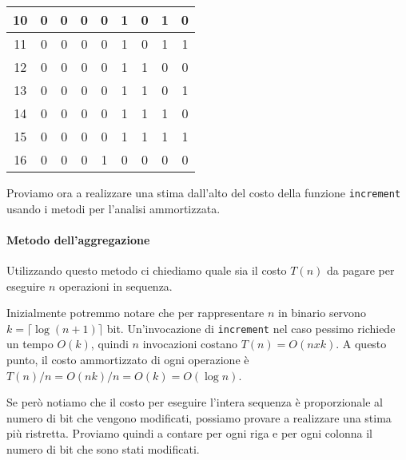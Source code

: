 \begin{eg}
\begin{table}[h!]
\begin{tabular}{|c|c|c|c|c|c|c|c|c|}
        \hline
        10 & 0 & 0 & 0 & 0 & 1 & 0 & 1 & 0\\
        \hline
        11 & 0 & 0 & 0 & 0 & 1 & 0 & 1 & 1\\
        \hline
        12 & 0 & 0 & 0 & 0 & 1 & 1 & 0 & 0\\
        \hline
        13 & 0 & 0 & 0 & 0 & 1 & 1 & 0 & 1\\
        \hline
        14 & 0 & 0 & 0 & 0 & 1 & 1 & 1 & 0\\
        \hline
        15 & 0 & 0 & 0 & 0 & 1 & 1 & 1 & 1\\
        \hline
        16 & 0 & 0 & 0 & 1 & 0 & 0 & 0 & 0\\
        \hline
    \end{tabular}
\end{table}

\bigskip\noindent
Proviamo ora a realizzare una stima dall'alto del costo della funzione
\texttt{increment} usando i metodi per l'analisi ammortizzata.

\paragraph{Metodo dell'aggregazione}
Utilizzando questo metodo ci chiediamo quale sia il costo $T(n)$ da pagare per
eseguire $n$ operazioni in sequenza.

Inizialmente potremmo notare che per rappresentare $n$ in binario servono
$k=\lceil\log(n+1)\rceil$ bit. Un'invocazione di \texttt{increment} nel caso
pessimo richiede un tempo $O(k)$, quindi $n$ invocazioni costano $T(n)=O(nxk)$.
A questo punto, il costo ammortizzato di ogni operazione è $T(n)/n=O(nk)/n=O(k)=O(\log n)$.

Se però notiamo che il costo per eseguire l'intera sequenza è proporzionale al
numero di bit che vengono modificati, possiamo provare a realizzare una stima
più ristretta. Proviamo quindi a contare per ogni riga e per ogni colonna il
numero di bit che sono stati modificati.


\end{eg}
